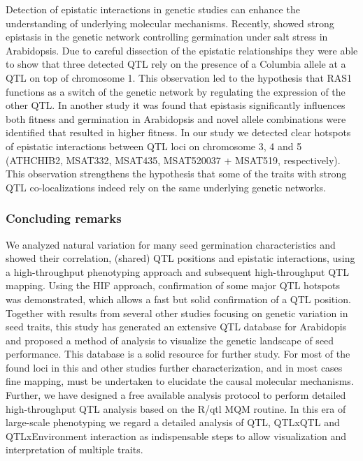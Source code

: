 Detection of epistatic interactions in genetic studies can enhance the understanding of underlying 
molecular mechanisms. Recently, \cite{Galpaz:2010} showed strong epistasis in the genetic network 
controlling germination under salt stress in Arabidopsis. Due to careful dissection of the epistatic 
relationships they were able to show that three detected QTL rely on the presence of a Columbia 
allele at a QTL on top of chromosome 1. This observation led to the hypothesis that RAS1 
\cite{Ren:2010} functions as a switch of the genetic network by regulating the expression of the 
other QTL. In another study it was found that epistasis significantly influences both fitness and 
germination in Arabidopsis \cite{Huang:2010} and novel allele combinations were identified that 
resulted in higher fitness. In our study we detected clear hotspots of epistatic interactions 
between QTL loci on chromosome 3, 4 and 5 (ATHCHIB2, MSAT332, MSAT435, MSAT520037 + MSAT519, 
respectively). This observation strengthens the hypothesis that some of the traits with strong 
QTL co-localizations indeed rely on the same underlying genetic networks.

\subsubsection{Concluding remarks}
We analyzed natural variation for many seed germination characteristics and showed their correlation, 
(shared) QTL positions and epistatic interactions, using a high-throughput phenotyping approach and 
subsequent high-throughput QTL mapping. Using the HIF approach, confirmation of some major QTL 
hotspots was demonstrated, which allows a fast but solid confirmation of a QTL position. Together 
with results from several other studies focusing on genetic variation in seed traits, this study 
has generated an extensive QTL database for Arabidopis and proposed a method of analysis to 
visualize the genetic landscape of seed performance. This database is a solid resource for further 
study. For most of the found loci in this and other studies further characterization, and in most 
cases fine mapping, must be undertaken to elucidate the causal molecular mechanisms. Further, we 
have designed a free available analysis protocol to perform detailed high-throughput QTL analysis 
based on the R/qtl MQM routine. In this era of large-scale phenotyping we regard a detailed analysis 
of QTL, QTLxQTL and QTLxEnvironment interaction as indispensable steps to allow visualization 
and interpretation of multiple traits.

